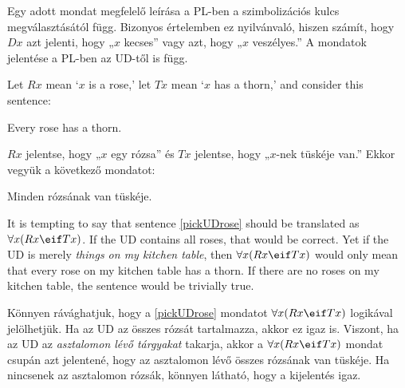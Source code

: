 Egy adott mondat megfelelő leírása a PL-ben a szimbolizációs kulcs megválasztásától függ. Bizonyos értelemben ez nyilvánvaló, hiszen számít, hogy $Dx$ azt jelenti, hogy „$x$ kecses” vagy azt, hogy „$x$ veszélyes.” A mondatok jelentése a PL-ben az UD-től is függ.

Let $Rx$ mean `$x$ is a rose,' let $Tx$ mean `$x$ has a thorn,' and consider this sentence:
\begin{earg}
\item[\ex{pickUDrose}] Every rose has a thorn.
\end{earg}

$Rx$ jelentse, hogy „$x$ egy rózsa” és $Tx$ jelentse, hogy „$x$-nek tüskéje van.” Ekkor vegyük a következő mondatot:
\begin{earg}
\item[\ex{pickUDrose}] Minden rózsának van tüskéje.
\end{earg}

It is tempting to say that sentence \ref{pickUDrose} should be translated as $\forall x(Rx \eif Tx)$. If the UD contains all roses, that would be correct. Yet if the UD is merely \emph{things on my kitchen table}, then $\forall x(Rx \eif Tx)$ would only mean that every rose on my kitchen table has a thorn. If there are no roses on my kitchen table, the sentence would be trivially true.

Könnyen rávághatjuk, hogy a \ref{pickUDrose} mondatot $\forall x(Rx \eif Tx)$ logikával jelölhetjük. Ha az UD az összes rózsát tartalmazza, akkor ez igaz is. Viszont, ha az UD az \emph{asztalomon lévő tárgyakat} takarja, akkor a $\forall x(Rx \eif Tx)$ mondat csupán azt jelentené, hogy az asztalomon lévő összes rózsának van tüskéje. Ha nincsenek az asztalomon rózsák, könnyen látható, hogy a kijelentés igaz.





